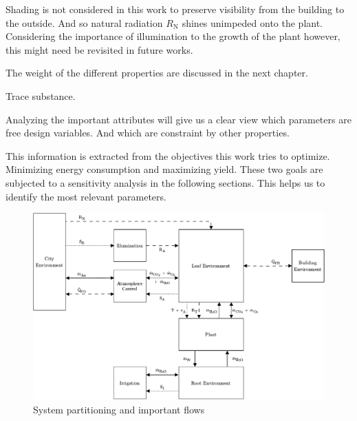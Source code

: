 Shading is not considered in this work to preserve visibility from the building to the outside.
And so natural radiation $R_\text{N}$ shines unimpeded onto the plant.
Considering the importance of illumination to the growth of the plant however, this might need be revisited in future works.

The weight of the different properties are discussed in the next chapter.

Trace substance.

Analyzing the important attributes will give us a clear view which parameters are free design variables.
And which are constraint by other properties.

This information is extracted from the objectives this work tries to optimize.
Minimizing energy consumption and maximizing yield.
These two goals are subjected to a sensitivity analysis in the following sections.
This helps us to identify the most relevant parameters.


\begin{figure}[htbp]
  \centering
  \includegraphics[width=\textwidth]{img/context.pdf}
  \caption{System partitioning and important flows}
\end{figure}

